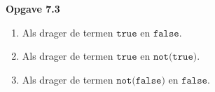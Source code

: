 \documentclass[a4paper,11pt]{article}
\begin{document}
{\bf Opgave 7.3}

\begin{enumerate}

\item %

Als drager de termen $\texttt{true}$ en $\texttt{false}$.

\item %

Als drager de termen $\texttt{true}$ en $\texttt{not(true)}$.

\item %

Als drager de termen $\texttt{not(false)}$ en $\texttt{false}$.

\end{enumerate}
\end{document}

